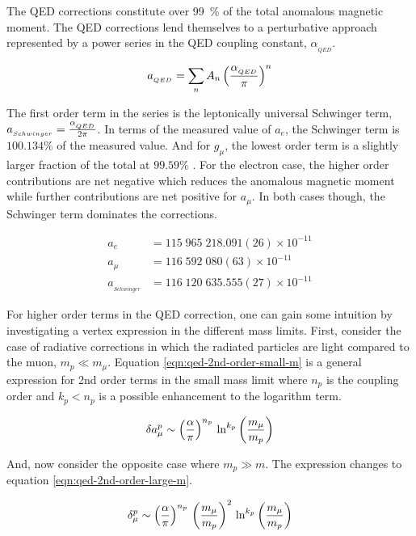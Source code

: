 The QED corrections constitute over \SI{99}{\percent} of the total anomalous magnetic moment.  The QED corrections lend themselves to a perturbative approach represented by a power series in the QED coupling constant, $\alpha_{_{QED}}$.

\begin{equation}
\label{eqn:qed-correction-series}
a_{_{QED}} = \sum_n{A_n \left(\frac{\alpha_{_{QED}}}{\pi} \right)^n}
\end{equation}

\noindent
The first order term in the series is the leptonically universal Schwinger term, $a_{_{Schwinger}} = \frac{\alpha_{_{QED}}}{2\pi}$.  In terms of the measured value of $a_e$, the Schwinger term is $100.134\%$ of the measured value. And for $g_\mu$, the lowest order term is a slightly larger fraction of the total at $99.59\%$ \cite{codata}.  For the electron case, the higher order contributions are net negative which reduces the anomalous magnetic moment while further contributions are net positive for $a_\mu$. In both cases though, the Schwinger term dominates the corrections.

\begin{align*}
a_{e}   & = 115\;965\;218.091(26) \times 10^{-11} \\
a_{\mu} & = 116\;592\;080(63) \times 10^{-11} \\
a_{_{Schwinger}} & = 116\;120\;635.555(27) \times 10^{-11}
\end{align*}

For higher order terms in the QED correction, one can gain some intuition by investigating a vertex expression in the different mass limits.  First, consider the case of radiative corrections in which the radiated particles are light compared to the muon, $m_p \ll m_\mu$.  Equation \ref{eqn:qed-2nd-order-small-m} is a general expression for 2nd order terms in the small mass limit \cite{the-muon-g-2} where $n_p$ is the coupling order and $k_p < n_p$ is a possible enhancement to the logarithm term.

\begin{equation}
\label{eqn:qed-2nd-order-small-m}
\delta a_\mu^p \sim \left(\frac{\alpha}{\pi} \right)^{n_p} \\
\ln^{k_p} \left( \frac{m_\mu}{m_p} \right)
\end{equation}

\noindent
And, now consider the opposite case where $m_p \gg m$.  The expression changes to equation \ref{eqn:qed-2nd-order-large-m}.

\begin{equation}
\label{eqn:qed-2nd-order-large-m}
\delta_\mu^p \sim \left( \frac{\alpha}{\pi} \right)^{n_p} \\
\left( \frac{m_\mu}{m_p} \right)^2 \\
\ln^{k_p} \left( \frac{m_\mu}{m_p} \right)
\end{equation}

